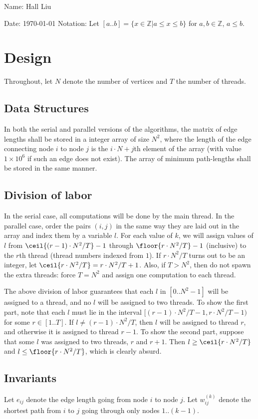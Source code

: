 \documentclass{article}
\newcommand{\zn}{\mathbb{Z}}
\begin{document}
Name: Hall Liu

Date: \today 
Notation: Let $[a..b]=\{x\in\zn|a\leq x\leq b\}$ for $a,b\in\zn$, $a\leq b$.
\section*{Design}
Throughout, let $N$ denote the number of vertices and $T$ the number of threads.
\subsection*{Data Structures}
In both the serial and parallel versions of the algorithms, the matrix of edge lengths shall be stored in a integer array of size $N^2$, where the length of the edge connecting node $i$ to node $j$ is the $i\cdot N+j$th element of the array (with value $1\times10^6$ if such an edge does not exist). The array of minimum path-lengths shall be stored in the same manner. 

\subsection*{Division of labor}
In the serial case, all computations will be done by the main thread. In the parallel case, order the pairs $(i,j)$ in the same way they are laid out in the array and index them by a variable $l$. For each value of $k$, we will assign values of $l$ from $\ceil{(r-1)\cdot N^2/T}-1$ through $\floor{r\cdot N^2/T}-1$ (inclusive) to the $r$th thread (thread numbers indexed from $1$). If $r\cdot N^2/T$ turns out to be an integer, let $\ceil{r\cdot N^2/T}=r\cdot N^2/T + 1$. Also, if $T>N^2$, then do not spawn the extra threads: force $T=N^2$ and assign one computation to each thread.

The above division of labor guarantees that each $l$ in $[0..N^2-1]$ will be assigned to a thread, and no $l$ will be assigned to two threads. To show the first part, note that each $l$ must lie in the interval $[(r-1)\cdot N^2/T-1, r\cdot N^2/T-1)$ for some $r\in[1..T]$. If $l\neq (r-1)\cdot N^2/T$, then $l$ will be assigned to thread $r$, and otherwise it is assigned to thread $r-1$. To show the second part, suppose that some $l$ was assigned to two threads, $r$ and $r+1$. Then $l\geq\ceil{r\cdot N^2/T}$ and $l\leq\floor{r\cdot N^2/T}$, which is clearly absurd. 
\subsection*{Invariants}
Let $e_{ij}$ denote the edge length going from node $i$ to node $j$. Let $w_{ij}^{(k)}$ denote the shortest path from $i$ to $j$ going through only nodes $1..(k-1)$. 
\end{document}

